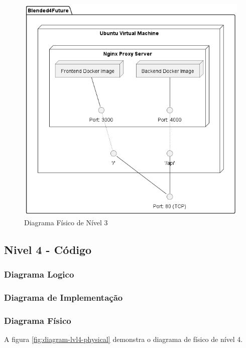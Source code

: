 \begin{figure}[h!tbp]
    \centering
    \includegraphics[width=0.7\linewidth]{capitulos/cap3-analisedoproblema/assets/arquiteturasistema/physical/physical_l3.png}
    \caption{Diagrama Físico de Nível 3}
    \label{fig:diagram-lvl3-physical}
\end{figure}





\subsection{Nivel 4 - Código}

\subsubsection{Diagrama Logico}

\subsubsection{Diagrama de Implementação}

\subsubsection{Diagrama Físico} 

A figura \ref{fig:diagram-lvl4-physical} demonstra o diagrama de físico de nível 4.


